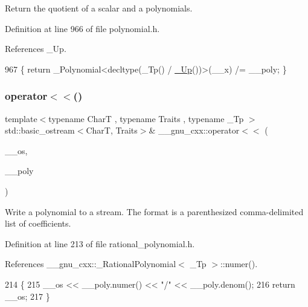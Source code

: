 Return the quotient of a scalar and a polynomials. 

Definition at line 966 of file polynomial.\+h.



References \+\_\+\+Up.


\begin{DoxyCode}
967     \{ \textcolor{keywordflow}{return} \_Polynomial<decltype(\_Tp() / \hyperlink{namespace____gnu__cxx_ab693ea357b6429b331e0bf09f9442385}{\_Up}())>(\_\_x) /= \_\_poly; \}
\end{DoxyCode}
\mbox{\label{namespace____gnu__cxx_a424044092ac184bfa1d17beb1b12e071}} 
\subsubsection{\texorpdfstring{operator$<$$<$()}{operator<<()}\hspace{0.1cm}{\footnotesize\ttfamily [1/3]}}
{\footnotesize\ttfamily template$<$typename CharT , typename Traits , typename \+\_\+\+Tp $>$ \\
std\+::basic\+\_\+ostream$<$CharT, Traits$>$\& \+\_\+\+\_\+gnu\+\_\+cxx\+::operator$<$$<$ (\begin{DoxyParamCaption}\item[{std\+::basic\+\_\+ostream$<$ CharT, Traits $>$ \&}]{\+\_\+\+\_\+os,  }\item[{const \hyperlink{class____gnu__cxx_1_1__RationalPolynomial}{\+\_\+\+Rational\+Polynomial}$<$ \+\_\+\+Tp $>$ \&}]{\+\_\+\+\_\+poly }\end{DoxyParamCaption})}

Write a polynomial to a stream. The format is a parenthesized comma-\/delimited list of coefficients. 

Definition at line 213 of file rational\+\_\+polynomial.\+h.



References \+\_\+\+\_\+gnu\+\_\+cxx\+::\+\_\+\+Rational\+Polynomial$<$ \+\_\+\+Tp $>$\+::numer().


\begin{DoxyCode}
214     \{
215       \_\_os << \_\_poly.numer() << \textcolor{stringliteral}{"/"} << \_\_poly.denom();
216       \textcolor{keywordflow}{return} \_\_os;
217     \}
\end{DoxyCode}
\mbox{\label{namespace____gnu__cxx_a143c7d2302fc613fd818f9149707b753}} 

